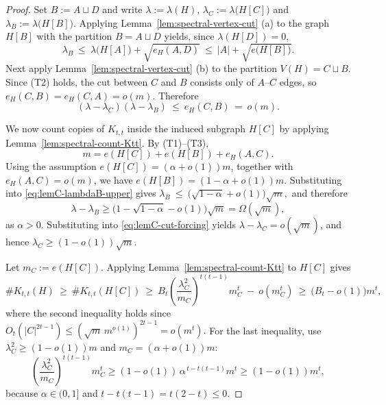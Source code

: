 \documentclass[10pt,a4paper]{amsart}
\newcommand{\Ktt}{K_{t,t}}
\begin{document}
\begin{proof}  
Set $B:=A\sqcup D$ and write 
$ \lambda:=\lambda(H)$, $ \lambda_C:=\lambda\bigl(H[C]\bigr)$ 
and $ \lambda_B:=\lambda\bigl(H[B]\bigr)$.  
Applying Lemma~\ref{lem:spectral-vertex-cut} \textup{(a)} to the graph $H[B]$ with the partition $B=A\sqcup D$ yields, since \(\lambda(H[D])=0\),
\begin{equation}\label{eq:lemC-lambdaB-upper}
  \lambda_B
  \ \le\
  \lambda\bigl(H[A]\bigr)+\sqrt{e_H(A,D)}
  \ \le\
  |A|+\sqrt{e\bigl(H[B]\bigr)}.
\end{equation} 
Next apply Lemma~\ref{lem:spectral-vertex-cut} \textup{(b)} to the partition $V(H)=C\sqcup B$.
Since \textup{(T2)} holds, the cut between $C$ and $B$ consists only of $A$--$C$ edges, so $e_H(C,B)=e_H(C,A)=o(m)$.
Therefore
\begin{equation}\label{eq:lemC-cut-forcing}
  (\lambda-\lambda_C)(\lambda-\lambda_B)\ \le\ e_H(C,B)\ =\ o(m).
\end{equation}

We now count copies of $\Ktt$ inside the induced subgraph  $H[C]$ by applying Lemma~\ref{lem:spectral-count-Ktt}. 
By \textup{(T1)}--\textup{(T3)},
\[
  m = e (H[C]) + e(H[B]) + e_H(A,C) .
\] 
Using the assumption $e(H[C])=(\alpha+o(1))m$, together with  $e_H(A,C)=o(m)$, we have $e(H[B])=(1-\alpha+o(1))m$. 
Substituting into \eqref{eq:lemC-lambdaB-upper} gives $\lambda_B\ \le\ \bigl(\sqrt{1-\alpha}+o(1)\bigr)\sqrt m,$
and therefore
\[
        \lambda-\lambda_B
        \ge 
        \bigl(1- \sqrt{1-\alpha} - o(1) \bigr) \sqrt{m}
        =
        \Omega(\sqrt m),
\]
as $\alpha >0$. 
Substituting into \eqref{eq:lemC-cut-forcing} yields $\lambda-\lambda_C=o(\sqrt m)$, and hence $\lambda_C\ge (1-o(1))\sqrt m$. 

Let \(m_C:=e(H[C])\).
Applying Lemma~\ref{lem:spectral-count-Ktt} to $H[C]$ gives
\[
  \texttt{\#}\Ktt(H)
  \ \ge\
  \texttt{\#}\Ktt(H[C])
  \ \ge\
  B_t\left(\frac{\lambda_C^2}{m_C}\right)^{t(t-1)}m_C^t\ -\ o(m_C^t)
  \ \ge \
  \bigl(B_t-o(1)\bigr)m^t,
\]
where the second inequality holds since $O_t(|C|^{2t-1})
        \le
        \left(\sqrt m\,m^{o(1)}\right)^{2t-1}
        =
        o(m^t).$
For the last inequality, use \(\lambda_C^2\ge (1-o(1))m\) and \(m_C=(\alpha+o(1))m\):
\[
  \left(\frac{\lambda_C^2}{m_C}\right)^{t(t-1)}m_C^t
  \ge
  (1-o(1))\,\alpha^{\,t-t(t-1)}m^t
  \ge
  (1-o(1))m^t,
\]
because \(\alpha\in(0,1]\) and \(t-t(t-1)=t(2-t)\le0\).
\end{proof}
\end{document}
